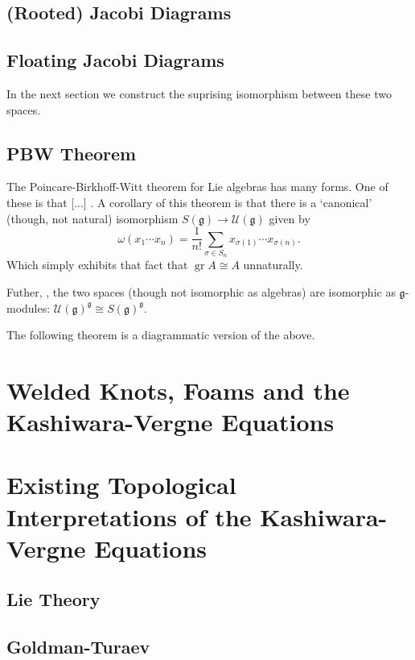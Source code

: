 \documentclass[12pt]{report}
\theoremstyle{regular}
\numberwithin{clause}{chapter}
\newcommand{\scaffold}[1]{
\begin{mdframed}[style=scaffold]
        {\color{teal}#1}
\end{mdframed}
}
\begin{document}
        \section{(Rooted) Jacobi Diagrams}

        \section{Floating Jacobi Diagrams}

        \scaffold{In the next section we construct the suprising isomorphism between these two spaces.}

        \section{PBW Theorem}

        \scaffold{The Poincare-Birkhoff-Witt theorem for Lie algebras has many forms. One of these is that [...] . A corollary of this theorem \cite{enveloping-algebras} is that there is a `canonical' (though, not natural) isomorphism \(S(\mathfrak{g}) \to \mathcal{U}(\mathfrak{g})\) given by \[\omega(x_{1} \cdots x_{n}) = \frac{1}{n!} \sum_{\sigma \in S_{n}} x_{\sigma(1)} \cdots x_{\sigma(n)}.\] Which simply exhibits that fact that \(\operatorname{gr} A \cong A\) unnaturally.}

        \scaffold{Futher, \cite{enveloping-algebras}, the two spaces (though not isomorphic as algebras) are isomorphic as \(\mathfrak{g}\)-modules: \(\mathcal{U}(\mathfrak{g})^{\mathfrak{g}} \cong S(\mathfrak{g})^{\mathfrak{g}}\).}

        \scaffold{The following theorem is a diagrammatic version of the above.}

        \chapter{Welded Knots, Foams and the Kashiwara-Vergne Equations}

        \chapter{Existing Topological Interpretations of the Kashiwara-Vergne Equations}

        \section{Lie Theory}

        \section{Goldman-Turaev}
\end{document}
